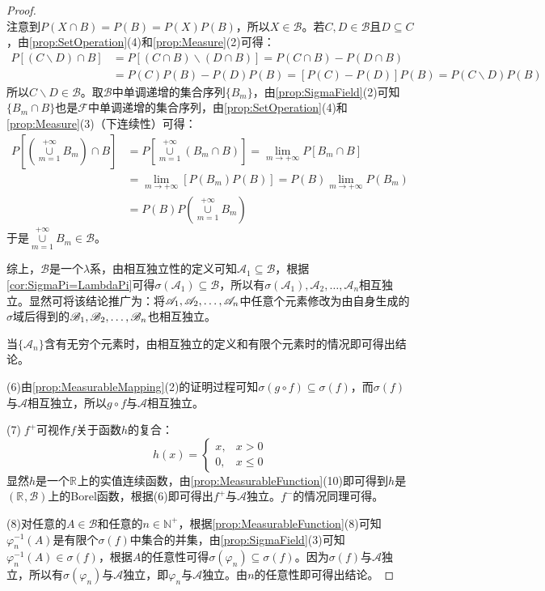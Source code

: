 \begin{proof}
\begin{equation*}
	\end{equation*}
	注意到$P(X\cap B)=P(B)=P(X)P(B)$，所以$X\in\mathscr{B}$。若$C,D\in\mathscr{B}$且$D\subseteq C$，由\cref{prop:SetOperation}(4)和\cref{prop:Measure}(2)可得：
	\begin{align*}
		P[(C\backslash D)\cap B]&=P[(C\cap B)\backslash(D\cap B)]=P(C\cap B)-P(D\cap B) \\
		&=P(C)P(B)-P(D)P(B)=[P(C)-P(D)]P(B)=P(C\backslash D)P(B)
	\end{align*}
	所以$C\backslash D\in\mathscr{B}$。取$\mathscr{B}$中单调递增的集合序列$\{B_m\}$，由\cref{prop:SigmaField}(2)可知$\{B_m\cap B\}$也是$\mathscr{F}$中单调递增的集合序列，由\cref{prop:SetOperation}(4)和\cref{prop:Measure}(3)（下连续性）可得：
	\begin{align*}
		P\left[\left(\underset{m=1}{\overset{+\infty}{\cup}}B_m\right)\cap B\right]&=P\left[\underset{m=1}{\overset{+\infty}{\cup}}(B_m\cap B)\right]=\lim_{m\to+\infty}P\left[B_m\cap B\right] \\
		&=\lim_{m\to+\infty}[P(B_m)P(B)]=P(B)\lim_{m\to+\infty}P(B_m) \\
		&=P(B)P\left(\underset{m=1}{\overset{+\infty}{\cup}}B_m\right)
	\end{align*}
	于是$\underset{m=1}{\overset{+\infty}{\cup}}B_m\in\mathscr{B}$。\par
	综上，$\mathscr{B}$是一个$\lambda$系，由相互独立性的定义可知$\mathscr{A}_1\subseteq\mathscr{B}$，根据\cref{cor:SigmaPi=LambdaPi}可得$\sigma(\mathscr{A}_1)\subseteq\mathscr{B}$，所以有$\sigma(\mathscr{A}_1),\mathscr{A}_2,\dots,\mathscr{A}_n$相互独立。显然可将该结论推广为：将$\mathscr{A}_1, \mathscr{A}_2, \dots, \mathscr{A}_{n}$中任意个元素修改为由自身生成的$\sigma$域后得到的$\mathscr{B}_1, \mathscr{B}_2, \dots, \mathscr{B}_{n}$也相互独立。\par
	当$\{\mathscr{A}_n\}$含有无穷个元素时，由相互独立的定义和有限个元素时的情况即可得出结论。\par
	(6)由\cref{prop:MeasurableMapping}(2)的证明过程可知$\sigma(g\circ f)\subseteq\sigma(f)$，而$\sigma(f)$与$\mathscr{A}$相互独立，所以$g\circ f$与$\mathscr{A}$相互独立。\par
	(7)$\;f^+$可视作$f$关于函数$h$的复合：
	\begin{equation*}
		h(x)=
		\begin{cases}
			x,&x>0 \\
			0,&x\leqslant0
		\end{cases}
	\end{equation*}
	显然$h$是一个$\mathbb{R}^{}$上的实值连续函数，由\cref{prop:MeasurableFunction}(10)即可得到$h$是$(\mathbb{R}^{},\mathcal{B})$上的Borel函数，根据(6)即可得出$f^+$与$\mathscr{A}$独立。$f^-$的情况同理可得。\par
	(8)对任意的$A\in\mathcal{B}$和任意的$n\in\mathbb{N}^+$，根据\cref{prop:MeasurableFunction}(8)可知$\varphi_n^{-1}(A)$是有限个$\sigma(f)$中集合的并集，由\cref{prop:SigmaField}(3)可知$\varphi_n^{-1}(A)\in\sigma(f)$，根据$A$的任意性可得$\sigma(\varphi_n)\subseteq\sigma(f)$。因为$\sigma(f)$与$\mathscr{A}$独立，所以有$\sigma(\varphi_n)$与$\mathscr{A}$独立，即$\varphi_n$与$\mathscr{A}$独立。由$n$的任意性即可得出结论。
\end{proof}

